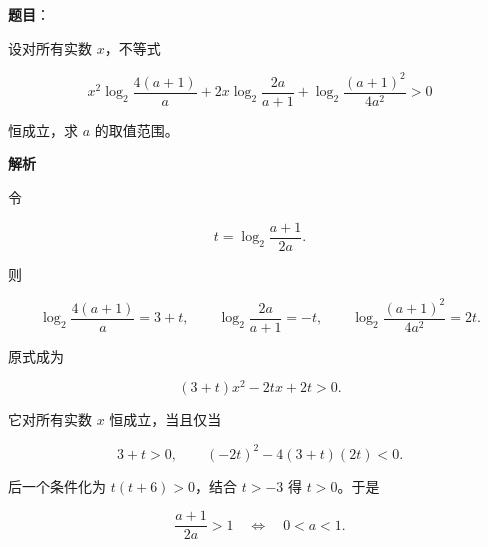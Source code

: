 \begin{answer}

\textbf{题目}：

设对所有实数 $x$，不等式

\nopagebreak[4]
\[
x^2\log_2\frac{4(a+1)}a
+2x\log_2\frac{2a}{a+1}
+\log_2\frac{(a+1)^2}{4a^2}>0
\]

恒成立，求 $a$ 的取值范围。

\textbf{解析}

令

\nopagebreak[4]
\[
t=\log_2\frac{a+1}{2a}.
\]

则

\nopagebreak[4]
\[
\log_2\frac{4(a+1)}a=3+t,\qquad
\log_2\frac{2a}{a+1}=-t,\qquad
\log_2\frac{(a+1)^2}{4a^2}=2t.
\]

原式成为

\nopagebreak[4]
\[
(3+t)x^2-2tx+2t>0.
\]

它对所有实数 $x$ 恒成立，当且仅当

\nopagebreak[4]
\[
3+t>0,\qquad
(-2t)^2-4(3+t)(2t)<0.
\]

后一个条件化为 $t(t+6)>0$，结合 $t>-3$ 得 $t>0$。于是

\nopagebreak[4]
\[
\frac{a+1}{2a}>1
\quad\Longleftrightarrow\quad
0<a<1.
\]


\end{answer}
